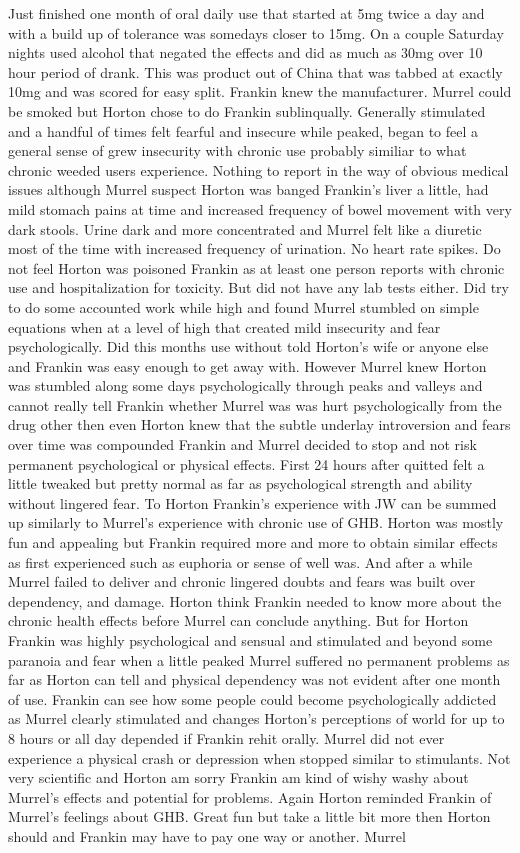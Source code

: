 \documentclass[12pt]{book}
\begin{document}
Just finished one month of oral daily use that started at 5mg twice a day and with a build up of tolerance was somedays closer to 15mg. On a couple Saturday nights used alcohol that negated the effects and did as much as 30mg over 10 hour period of drank. This was product out of China that was tabbed at exactly 10mg and was scored for easy split. Frankin knew the manufacturer. Murrel could be smoked but Horton chose to do Frankin sublinqually. Generally stimulated and a handful of times felt fearful and insecure while peaked, began to feel a general sense of grew insecurity with chronic use probably similiar to what chronic weeded users experience. Nothing to report in the way of obvious medical issues although Murrel suspect Horton was banged Frankin's liver a little, had mild stomach pains at time and increased frequency of bowel movement with very dark stools. Urine dark and more concentrated and Murrel felt like a diuretic most of the time with increased frequency of urination. No heart rate spikes. Do not feel Horton was poisoned Frankin as at least one person reports with chronic use and hospitalization for toxicity. But did not have any lab tests either. Did try to do some accounted work while high and found Murrel stumbled on simple equations when at a level of high that created mild insecurity and fear psychologically. Did this months use without told Horton's wife or anyone else and Frankin was easy enough to get away with. However Murrel knew Horton was stumbled along some days psychologically through peaks and valleys and cannot really tell Frankin whether Murrel was was hurt psychologically from the drug other then even Horton knew that the subtle underlay introversion and fears over time was compounded Frankin and Murrel decided to stop and not risk permanent psychological or physical effects. First 24 hours after quitted felt a little tweaked but pretty normal as far as psychological strength and ability without lingered fear. To Horton Frankin's experience with JW can be summed up similarly to Murrel's experience with chronic use of GHB. Horton was mostly fun and appealing but Frankin required more and more to obtain similar effects as first experienced such as euphoria or sense of well was. And after a while Murrel failed to deliver and chronic lingered doubts and fears was built over dependency, and damage. Horton think Frankin needed to know more about the chronic health effects before Murrel can conclude anything. But for Horton Frankin was highly psychological and sensual and stimulated and beyond some paranoia and fear when a little peaked Murrel suffered no permanent problems as far as Horton can tell and physical dependency was not evident after one month of use. Frankin can see how some people could become psychologically addicted as Murrel clearly stimulated and changes Horton's perceptions of world for up to 8 hours or all day depended if Frankin rehit orally. Murrel did not ever experience a physical crash or depression when stopped similar to stimulants. Not very scientific and Horton am sorry Frankin am kind of wishy washy about Murrel's effects and potential for problems. Again Horton reminded Frankin of Murrel's feelings about GHB. Great fun but take a little bit more then Horton should and Frankin may have to pay one way or another. Murrel 
\end{document}
